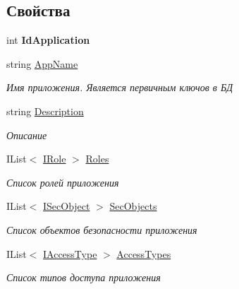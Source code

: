 \subsection*{Свойства}
\begin{DoxyCompactItemize}
\item 
\mbox{\label{interface_security_1_1_interfaces_1_1_model_1_1_i_application_ad01f3322f6125fb88e359ec483c686a4}} 
int {\bfseries Id\+Application}
\item 
string \hyperlink{interface_security_1_1_interfaces_1_1_model_1_1_i_application_a9bd4a564a9e6a2d8a74256392dcdfbaa}{App\+Name}
\begin{DoxyCompactList}\small\item\em Имя приложения. Является первичным ключов в БД \end{DoxyCompactList}\item 
string \hyperlink{interface_security_1_1_interfaces_1_1_model_1_1_i_application_a7f35957643f86f7839c00703c8b918d1}{Description}
\begin{DoxyCompactList}\small\item\em Описание \end{DoxyCompactList}\item 
I\+List$<$ \hyperlink{interface_security_1_1_interfaces_1_1_model_1_1_i_role}{I\+Role} $>$ \hyperlink{interface_security_1_1_interfaces_1_1_model_1_1_i_application_a0be854668c5fa137e9be605ab726adea}{Roles}
\begin{DoxyCompactList}\small\item\em Список ролей приложения \end{DoxyCompactList}\item 
I\+List$<$ \hyperlink{interface_security_1_1_interfaces_1_1_model_1_1_i_sec_object}{I\+Sec\+Object} $>$ \hyperlink{interface_security_1_1_interfaces_1_1_model_1_1_i_application_ac70d468d5bc97965451c57ccf8d79faa}{Sec\+Objects}
\begin{DoxyCompactList}\small\item\em Список объектов безопасности приложения \end{DoxyCompactList}\item 
I\+List$<$ \hyperlink{interface_security_1_1_interfaces_1_1_model_1_1_i_access_type}{I\+Access\+Type} $>$ \hyperlink{interface_security_1_1_interfaces_1_1_model_1_1_i_application_ae568bb4ca755567fe1ef6bea84f9c979}{Access\+Types}
\begin{DoxyCompactList}\small\item\em Список типов доступа приложения \end{DoxyCompactList}\end{DoxyCompactItemize}


